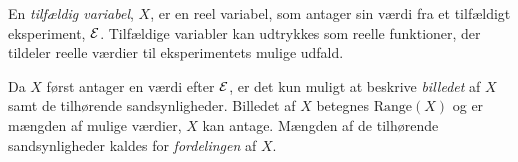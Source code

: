 











En \textit{tilfældig variabel}, $X$, er en reel variabel, som antager sin værdi fra et tilfældigt eksperiment, $\mathcal{E}$. 
Tilfældige variabler kan udtrykkes som reelle funktioner, der tildeler reelle værdier til eksperimentets mulige udfald.


Da $X$ først antager en værdi efter $\mathcal{E}$, er det kun muligt at beskrive \textit{billedet} af $X$ samt de tilhørende sandsynligheder. Billedet af $X$ betegnes $\text{Range}(X)$ og er mængden af mulige værdier, $X$ kan antage. Mængden af de tilhørende sandsynligheder kaldes for \textit{fordelingen} af $X$.

